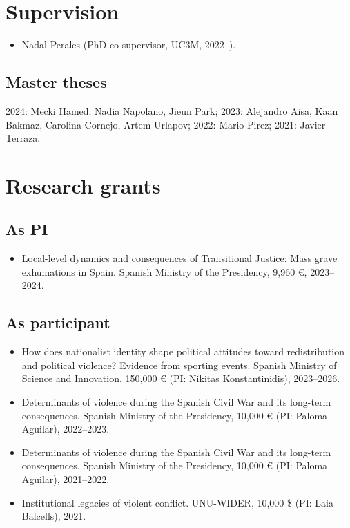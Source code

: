 \documentclass[a4paper, 12pt]{article}
\begin{document}
\section*{Supervision}

\begin{itemize}[leftmargin=*, nolistsep]
	\item Nadal Perales (PhD co-supervisor, UC3M, 2022--).
\end{itemize}

\subsection*{Master theses}

2024: Mecki Hamed, Nadia Napolano, Jieun Park;
2023: Alejandro Aisa, Kaan Bakmaz, Carolina Cornejo, Artem Urlapov;
2022: Mario Pirez;
2021: Javier Terraza.

\section*{Research grants}

\subsection*{As PI}

\begin{itemize}[leftmargin=12pt, itemsep=0pt]
  \item Local-level dynamics and consequences of Transitional Justice: Mass grave exhumations in Spain. Spanish Ministry of the Presidency, 9,960 €, 2023--2024. %
\end{itemize}

\subsection*{As participant}

\begin{itemize}[leftmargin=12pt, itemsep=0pt]
	\item How does nationalist identity shape political attitudes toward redistribution and political violence? Evidence from sporting events. Spanish Ministry of Science and Innovation, 150,000 € (PI: Nikitas Konstantinidis), 2023--2026. %
	\item Determinants of violence during the Spanish Civil War and its long-term consequences. Spanish Ministry of the Presidency, 10,000 € (PI: Paloma Aguilar), 2022--2023. %
	\item Determinants of violence during the Spanish Civil War and its long-term consequences. Spanish Ministry of the Presidency, 10,000 € (PI: Paloma Aguilar), 2021--2022. %
	\item Institutional legacies of violent conflict. UNU-WIDER, 10,000 \$ (PI: Laia Balcells), 2021.
\end{itemize}
\end{document}
